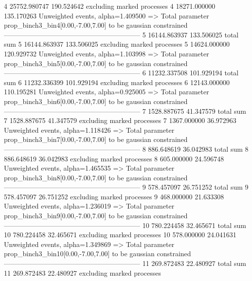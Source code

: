 4          25752.980747    190.524642      excluding marked processes    
4          18271.000000    135.170263      Unweighted events, alpha=1.409500
  => Total parameter prop_binch3_bin4[0.00,-7.00,7.00] to be gaussian constrained
------------------------------------------------------------
5          16144.863937    133.506025      total sum                     
5          16144.863937    133.506025      excluding marked processes    
5          14624.000000    120.929732      Unweighted events, alpha=1.103998
  => Total parameter prop_binch3_bin5[0.00,-7.00,7.00] to be gaussian constrained
------------------------------------------------------------
6          11232.337508    101.929194      total sum                     
6          11232.336399    101.929194      excluding marked processes    
6          12143.000000    110.195281      Unweighted events, alpha=0.925005
  => Total parameter prop_binch3_bin6[0.00,-7.00,7.00] to be gaussian constrained
------------------------------------------------------------
7          1528.887675     41.347579       total sum                     
7          1528.887675     41.347579       excluding marked processes    
7          1367.000000     36.972963       Unweighted events, alpha=1.118426
  => Total parameter prop_binch3_bin7[0.00,-7.00,7.00] to be gaussian constrained
------------------------------------------------------------
8          886.648619      36.042983       total sum                     
8          886.648619      36.042983       excluding marked processes    
8          605.000000      24.596748       Unweighted events, alpha=1.465535
  => Total parameter prop_binch3_bin8[0.00,-7.00,7.00] to be gaussian constrained
------------------------------------------------------------
9          578.457097      26.751252       total sum                     
9          578.457097      26.751252       excluding marked processes    
9          468.000000      21.633308       Unweighted events, alpha=1.236019
  => Total parameter prop_binch3_bin9[0.00,-7.00,7.00] to be gaussian constrained
------------------------------------------------------------
10         780.224458      32.465671       total sum                     
10         780.224458      32.465671       excluding marked processes    
10         578.000000      24.041631       Unweighted events, alpha=1.349869
  => Total parameter prop_binch3_bin10[0.00,-7.00,7.00] to be gaussian constrained
------------------------------------------------------------
11         269.872483      22.480927       total sum                     
11         269.872483      22.480927       excluding marked processes    
